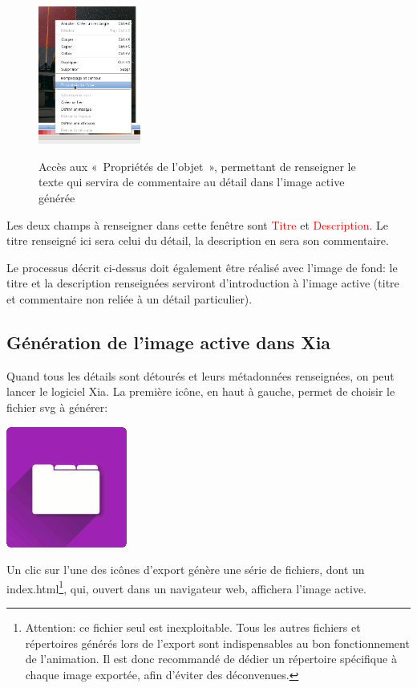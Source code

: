 \documentclass[a4paper,12pt]{report}
\newcommand{\chemin}[1]{\textcolor{red}{#1}}
\begin{document}
\begin{figure}[htp]
 \centering
 \caption{Accès aux «~Propriétés de l'objet~», permettant de renseigner le texte 
 qui servira de commentaire au détail dans l'image active générée}
 \includegraphics[width=0.3\textwidth]{./images/proprietes_objet}
 \label{proprietes_objet}
\end{figure}

Les deux champs à renseigner dans cette fenêtre sont \chemin{Titre} et \chemin{Description}.
Le titre renseigné ici sera celui du détail, la description en sera son commentaire.

Le processus décrit ci-dessus doit également être réalisé avec l'image de fond: le titre et la description renseignées
serviront d'introduction à l'image active (titre et commentaire non reliée à un détail particulier).

\subsection{Génération de l'image active dans Xia}

Quand tous les détails sont détourés et leurs métadonnées renseignées, on peut lancer le logiciel Xia.
La première icône, en haut à gauche, permet de choisir le fichier svg à générer:
\begin{center}
\includegraphics[scale=0.4]{./images/xia_open} 
\end{center}

Un clic sur l'une des icônes d'export génère une série de fichiers, dont un index.html\footnote{Attention: 
ce fichier seul est inexploitable. Tous les autres fichiers et répertoires générés lors de l'export 
sont indispensables au bon fonctionnement de l'animation. Il est donc recommandé de dédier un répertoire 
spécifique à chaque image exportée, afin d'éviter des déconvenues.}, qui, ouvert dans un navigateur
web, affichera l'image active.
\end{document}
